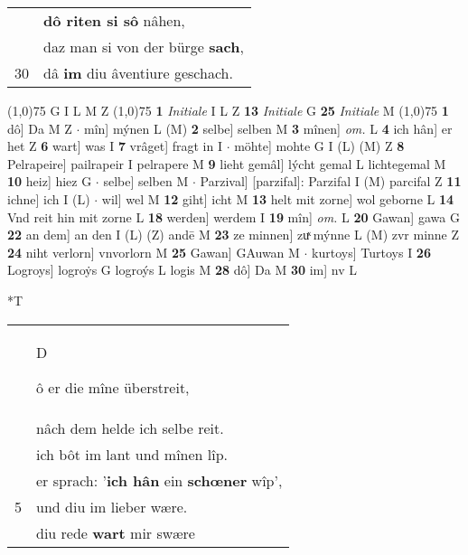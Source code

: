 \documentclass[8pt,a4paper,notitlepage]{article}
\begin{document}
\begin{table}[ht]
\begin{minipage}[t]{0.5\linewidth}
\begin{tabular}{rl}
 & \textbf{dô riten si sô} nâhen,\\ 
 & daz man si von der bürge \textbf{sach},\\ 
30 & dâ \textbf{im} diu âventiure geschach.\\ 
\end{tabular}
\scriptsize
\line(1,0){75} \newline
G I L M Z \newline
\line(1,0){75} \newline
\textbf{1} \textit{Initiale} I L Z  \textbf{13} \textit{Initiale} G  \textbf{25} \textit{Initiale} M  \newline
\line(1,0){75} \newline
\textbf{1} dô] Da M Z  $\cdot$ mîn] mýnen L (M) \textbf{2} selbe] selben M \textbf{3} mînen] \textit{om.} L \textbf{4} ich hân] er het Z \textbf{6} wart] was I \textbf{7} vrâget] fragt in I  $\cdot$ möhte] mohte G I (L) (M) Z \textbf{8} Pelrapeire] pailrapeir I pelrapere M \textbf{9} lieht gemâl] lýcht gemal L lichtegemal M \textbf{10} heiz] hiez G  $\cdot$ selbe] selben M  $\cdot$ Parzival] [parzifal]: Parzifal I (M) parcifal Z \textbf{11} ichne] ich I (L)  $\cdot$ wil] wel M \textbf{12} giht] icht M \textbf{13} helt mit zorne] wol geborne L \textbf{14} Vnd reit hin mit zorne L \textbf{18} werden] werdem I \textbf{19} mîn] \textit{om.} L \textbf{20} Gawan] gawa G \textbf{22} an dem] an den I (L) (Z) andē M \textbf{23} ze minnen] zuͯ mýnne L (M) zvr minne Z \textbf{24} niht verlorn] vnvorlorn M \textbf{25} Gawan] GAuwan M  $\cdot$ kurtoys] Turtoys I \textbf{26} Logroys] logroẏs G logroýs L logis M \textbf{28} dô] Da M \textbf{30} im] nv L \newline
\end{minipage}
\hspace{0.5cm}
\begin{minipage}[t]{0.5\linewidth}
\small
\begin{center}*T
\end{center}
\begin{tabular}{rl}
 & \begin{large}D\end{large}ô er die mîne überstreit,\\ 
 & nâch dem helde ich selbe reit.\\ 
 & ich bôt im lant und mînen lîp.\\ 
 & er sprach: '\textbf{ich hân} ein \textbf{schœner} wîp',\\ 
5 & und diu im lieber wære.\\ 
 & diu rede \textbf{wart} mir swære\\ 

\end{tabular}
\end{minipage}
\end{table}
\end{document}
